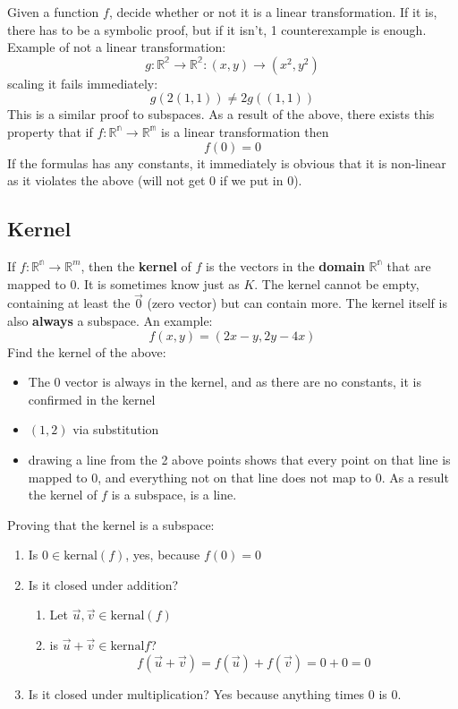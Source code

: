 \documentclass[11pt]{book}
\begin{document}
{{{Given a function $f$, decide whether or not it is a linear transformation. If it is, there has to be a symbolic proof, but if it isn't, 1 counterexample is enough.
Example of not a linear transformation: \[
g:\mathbb{R^{2}}\to\mathbb{R^{2}}:\left(x,y\right)\to\left(x^{2},y^{2}\right)
\] scaling it fails immediately: \[
g\left(2\left(1,1\right)\right)\ne2g\left(\left(1,1\right)\right)
\] This is a similar proof to subspaces. 
As a result of the above, there exists this property that if $f:\mathbb{R^{n}}\to\mathbb{R^{m}}$ is a linear transformation then \[
f\left(0\right)=0
\] If the formulas has any constants, it immediately is obvious that it is non-linear as it violates the above (will not get 0 if we put in 0).
}
\subsection{Kernel}
\par{If $f:\mathbb{R^{n}}\to\mathbb{R}^{m}$, then the \textbf{kernel} of $f$ is the vectors in the  \textbf{domain} $\mathbb{R^{n}}$ that are mapped to 0. It is sometimes know just as $K$. The kernel cannot be empty, containing at least the $\vec{0}$ (zero vector) but can contain more. The kernel itself is also \textbf{always} a subspace. An example: \[
f\left(x,y\right)=\left(2x-y,2y-4x\right)
\] Find the kernel of the above:
\begin{itemize}
	\item{The 0 vector is always in the kernel, and as there are no constants, it is confirmed in the kernel} \\
	\item{$\left(1,2\right)$ via substitution}
	\item{drawing a line from the 2 above points shows that every point on that line is mapped to 0, and everything not on that line does not map to 0. As a result the kernel of $f$ is a subspace, is a line.}
\end{itemize}

Proving that the kernel is a subspace:
\begin{enumerate}
	\item{Is $0\in \mathrm{kernal}\left(f\right)$, yes, because  $f\left(0\right)=0$}
	\item{Is it closed under addition?
		\begin{enumerate}
			\item{Let $\vec{u},\vec{v}\in \mathrm{kernal}\left(f\right)$}
			\item{is $\vec{u}+\vec{v}\in \mathrm{kernal}f$?\[
			f\left(\vec{u}+\vec{v}\right)=f\left(\vec{u}\right)+f\left(\vec{v}\right)=0+0=0
			\] }
		\end{enumerate}}
	\item{Is it closed under multiplication? Yes because anything times 0 is 0.}
\end{enumerate}}
}}
\end{document}
